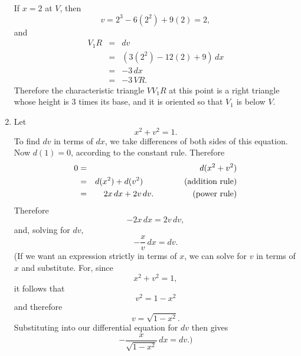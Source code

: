 \documentclass[polutonikogreek,english,twoside,openright]{article}
\begin{document}
\begin{enumerate}
If $x= 2$ at $V$, then 
$$v = 2^3 - 6(2^2) + 9(2) = 2,$$
and
\begin{eqnarray*}
V_1R & = & dv\\
& = & (3(2^2) - 12(2) +9)\,dx\\
& = & -3\,dx\\
& = & -3\,VR.
\end{eqnarray*}
Therefore the characteristic triangle $VV_1R$ at this point is a right
triangle whose height is 3 times its base, and it is oriented so that
$V_1$ is below $V$.

\item Let 
$$x^2 + v^2 =1.$$ 
To find $dv$ in terms of $dx$, we take differences of both sides of
this equation.  Now $d(1) =0$, according to the constant rule.
Therefore
\begin{eqnarray*}
0 & = & d(x^2 + v^2) \\
& = & d(x^2) + d(v^2) \mbox{\hspace{5em}(addition rule)}\\
& = & 2x\,dx + 2v\,dv. \mbox{\hspace{4.4em} (power rule)}\\
\end{eqnarray*}
Therefore
$$-2x\,dx = 2v\,dv,$$
and, solving for $dv$,
$$-\frac{x}{v}\,dx = dv.$$
(If we want an expression strictly in terms of $x$, we can solve for
$v$ in terms of $x$ and substitute.  For, since
$$x^2 + v^2 = 1,$$
it follows that 
$$v^2 = 1 - x^2$$
and therefore
$$v = \sqrt{1 -x^2}.$$
Substituting into our differential equation for $dv$ then gives
$$-\frac{x}{\sqrt{1-x^2}}\,dx = dv.)$$



\end{enumerate}
\end{document}
